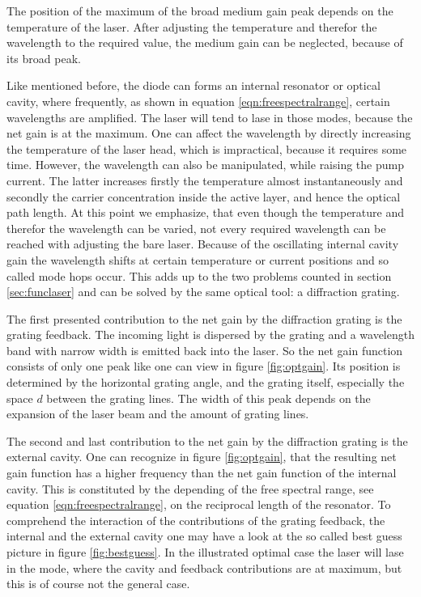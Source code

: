 The position of the maximum of the broad medium gain peak depends on the temperature of the laser.
After adjusting the temperature and therefor the wavelength to the required value, the medium gain can be neglected, because
of its broad peak.

Like mentioned before, the diode can forms an internal resonator or optical cavity, where frequently, as shown in equation
\eqref{eqn:freespectralrange}, certain wavelengths are amplified. The laser will tend to lase in those modes,
because the net gain is at the maximum. One can affect the wavelength by directly increasing the temperature of the
laser head, which is impractical, because it requires some time. However, the wavelength can also be manipulated, while
raising the pump current. The latter increases firstly the temperature almost instantaneously and secondly the carrier
concentration inside the active layer, and hence the optical path length.
At this point we emphasize, that even though the temperature and therefor the wavelength can be varied, not every required
wavelength can be reached with adjusting the bare laser. Because of the oscillating internal cavity gain the wavelength shifts at
certain temperature or current positions and so called mode hops occur. This adds up to the two problems counted in section
\ref{sec:funclaser} and can be solved by the same optical tool: a diffraction grating.

The first presented contribution to the net gain by the diffraction grating is the grating feedback. The incoming light
is dispersed by the grating and a wavelength band with narrow width is emitted back into the laser. So the net gain
function consists of only one peak like one can view in figure \ref{fig:optgain}. Its position is determined by the horizontal grating angle,
and the grating itself, especially the space $d$ between the grating lines. The width of this peak depends on the
expansion of the laser beam and the amount of grating lines.

The second and last contribution to the net gain by the diffraction grating is the external cavity. One can recognize in figure \ref{fig:optgain},
that the resulting net gain function has a higher frequency than the net gain function of the internal cavity. This is constituted by
the depending of the free spectral range, see equation \eqref{eqn:freespectralrange}, on the reciprocal length of the resonator.
To comprehend the interaction of the contributions of the grating feedback, the internal and the external cavity one may have a
look at the so called best guess picture in figure \ref{fig:bestguess}. In the illustrated optimal case the laser will lase in the mode, where
the cavity and feedback contributions are at maximum, but this is of course not the general case.

